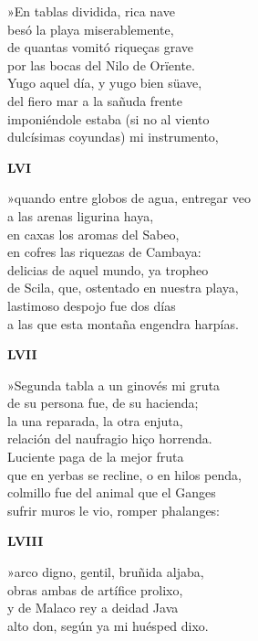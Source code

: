 \documentclass[11pt,twoside]{article}
\newcommand{\ch}{\emph{\textbf{Ch}}}
\begin{document}
»En tablas dividida, rica nave\\
besó la playa miserablemente,\\
de quantas vomitó riqueças grave\\
por las bocas del Nilo de Orïente.\\
Yugo aquel día, y yugo bien süave,\\
del fiero mar a la sañuda frente\\
imponiéndole estaba (si no al viento\\
dulcísimas coyundas) mi instrumento,\par\poend
%
\begin{center}
	\textbf{LVI}
\end{center}\postart
»quando entre globos de agua, entregar veo\\
a las arenas ligurina haya,\\
en caxas los aromas del Sabeo,\\
en cofres las riquezas de Cambaya:\\
delicias de aquel mundo, ya tropheo\\
de Scila, que, ostentado en nuestra playa,\\
lastimoso despojo fue dos días\\
a las que esta montaña engendra harpías.\par\poend
\repage
%
\begin{center}
	\textbf{LVII}
\end{center}\postart
»Segunda tabla a un ginovés mi gruta\\
de su persona fue, de su hacienda;\\
la una reparada, la otra enjuta,\\
relación del naufragio hiço horrenda.\\
Luciente paga de la mejor fruta\\
que en yerbas se recline, o en hilos penda,\\
colmillo fue del animal que el Ganges\\
sufrir muros le vio, romper phalanges:\par\poend
%
\begin{center}
	\textbf{LVIII}
\end{center}\postart
»arco digno, gentil, bruñida aljaba,\\
obras ambas de artífice prolixo,\\
y de Malaco rey a deidad Java\footA{}{laua \emph{err.} {\ch}}\\
alto don, según ya mi huésped dixo.\\
\end{document}
